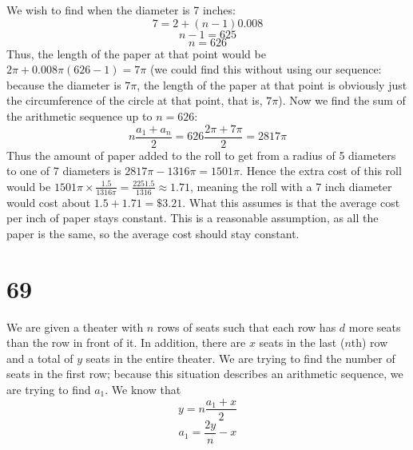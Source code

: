 \documentclass{article}
\theoremstyle{definition}
\newcommand{\?}{\stackrel{?}{=}}
\begin{document}
We wish to find when the diameter is 7 inches:
\[ 7=2+(n-1)0.008 \] \[ n-1=625 \] \[ n=626 \] Thus, the length of the paper at that point would be $2\pi+0.008\pi (626-1)=7\pi$ (we could find this without using our 
sequence: because the diameter is $7\pi$, the length of the paper at that point is obviously just the circumference of the circle at that point, that is, $7\pi$). 
Now we find the sum of the arithmetic sequence up to $n=626$: \[ n\frac{a_1+a_n}{2}=626\frac{2\pi+7\pi}{2}=2817\pi \] 
Thus the amount of paper added to the roll to get from a radius of 5 diameters to one of 7 diameters is $2817\pi -1316\pi=1501\pi$. Hence the extra cost of this roll 
would be $1501\pi\times\frac{1.5}{1316\pi}=\frac{2251.5}{1316}\approx 1.71$, meaning the roll with a 7 inch diameter would cost about $1.5+1.71=\$3.21$. What this assumes 
is that the average cost per inch of paper stays constant. This is a reasonable assumption, as all the paper is the same, so the average cost should stay constant.

\section*{69}
We are given a theater with $n$ rows of seats such that each row has $d$ more seats than the row in front of it. In addition, there are $x$ seats in the last ($n$th) row and a total of $y$ seats in the 
entire theater. We are trying to find the number of seats in the first row; because this situation describes an arithmetic sequence, we are trying to find $a_1$. We know that 
\[ y=n\frac{a_1+x}{2} \] \[ a_1=\dfrac{2y}{n}-x \]
\end{document}
